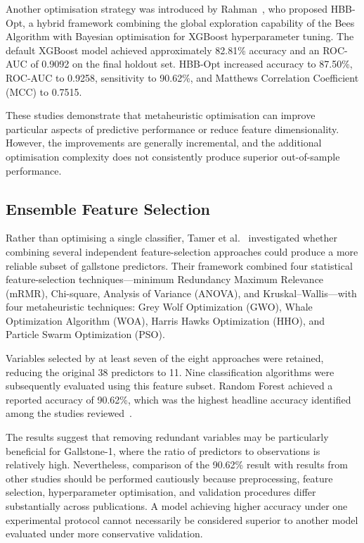 Another optimisation strategy was introduced by Rahman~\cite{rahman2026hbb}, who proposed HBB-Opt, a hybrid framework combining the global exploration capability of the Bees Algorithm with Bayesian optimisation for XGBoost hyperparameter tuning. The default XGBoost model achieved approximately 82.81\% accuracy and an ROC-AUC of 0.9092 on the final holdout set. HBB-Opt increased accuracy to 87.50\%, ROC-AUC to 0.9258, sensitivity to 90.62\%, and Matthews Correlation Coefficient (MCC) to 0.7515.

These studies demonstrate that metaheuristic optimisation can improve particular aspects of predictive performance or reduce feature dimensionality. However, the improvements are generally incremental, and the additional optimisation complexity does not consistently produce superior out-of-sample performance.

\subsection{Ensemble Feature Selection}

Rather than optimising a single classifier, Tamer et al.~\cite{tamer2026novel} investigated whether combining several independent feature-selection approaches could produce a more reliable subset of gallstone predictors. Their framework combined four statistical feature-selection techniques---minimum Redundancy Maximum Relevance (mRMR), Chi-square, Analysis of Variance (ANOVA), and Kruskal--Wallis---with four metaheuristic techniques: Grey Wolf Optimization (GWO), Whale Optimization Algorithm (WOA), Harris Hawks Optimization (HHO), and Particle Swarm Optimization (PSO).

Variables selected by at least seven of the eight approaches were retained, reducing the original 38 predictors to 11. Nine classification algorithms were subsequently evaluated using this feature subset. Random Forest achieved a reported accuracy of 90.62\%, which was the highest headline accuracy identified among the studies reviewed~\cite{tamer2026novel}.

The results suggest that removing redundant variables may be particularly beneficial for Gallstone-1, where the ratio of predictors to observations is relatively high. Nevertheless, comparison of the 90.62\% result with results from other studies should be performed cautiously because preprocessing, feature selection, hyperparameter optimisation, and validation procedures differ substantially across publications. A model achieving higher accuracy under one experimental protocol cannot necessarily be considered superior to another model evaluated under more conservative validation.

